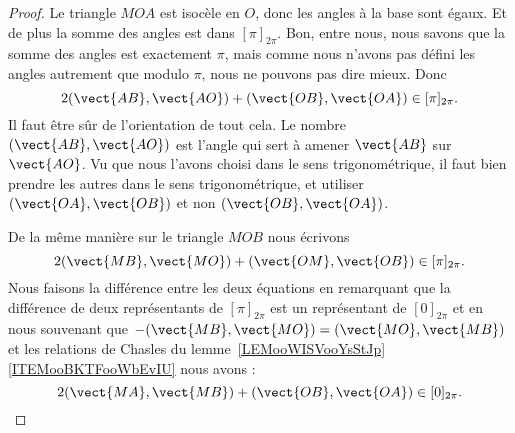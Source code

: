 \begin{proof}
	Le triangle \( MOA\) est isocèle en \( O\), donc les angles à la base sont égaux. Et de plus la somme des angles est dans \( [\pi]_{2\pi}\). Bon, entre nous, nous savons que la somme des angles est exactement \( \pi\), mais comme nous n'avons pas défini les angles autrement que modulo \( \pi\), nous ne pouvons pas dire mieux. Donc
	\begin{equation}
		2(\vect{ AB },\vect{ AO })+(\vect{ OB },\vect{ OA })\in [\pi]_{2\pi}.
	\end{equation}
	Il faut être sûr de l'orientation de tout cela. Le nombre \( (\vect{ AB },\vect{ AO })\) est l'angle qui sert à amener \( \vect{ AB }\) sur \( \vect{ AO }\). Vu que nous l'avons choisi dans le sens trigonométrique, il faut bien prendre les autres dans le sens trigonométrique, et utiliser \( (\vect{ OA }, \vect{ OB })\) et non \( (\vect{ OB },\vect{ OA })\).

	\begin{center}
		
	\end{center}

	De la même manière sur le triangle \( MOB\) nous écrivons
	\begin{equation}
		2(\vect{ MB },\vect{ MO })+(\vect{ OM },\vect{ OB })\in[\pi]_{2\pi}.
	\end{equation}
	Nous faisons la différence entre les deux équations en remarquant que la différence de deux représentants de \( [\pi]_{2\pi}\) est un représentant de \( [0]_{2\pi}\) et en nous souvenant que \( -(\vect{ MB },\vect{ MO })=(\vect{ MO },\vect{ MB })\) et les relations de Chasles du lemme~\ref{LEMooWISVooYsStJp}\ref{ITEMooBKTFooWbEvIU} nous avons :
	\begin{equation}
		2(\vect{ MA },\vect{ MB })+(\vect{ OB },\vect{ OA })\in[0]_{2\pi}.
	\end{equation}
\end{proof}

